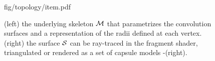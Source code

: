 \begin{figure}[h]
\centering
\begin{overpic} 
[width=\linewidth]
{fig/topology/item.pdf}
\end{overpic}
\caption{(left) the underlying skeleton $\mathcal{M}$ that parametrizes the convolution surfaces and a representation of the radii defined at each vertex. (right) the surface $\mathcal{S}$ can be ray-traced in the fragment shader, triangulated or rendered as a set of capsule models -(right). }
\label{fig:topology}
\end{figure}